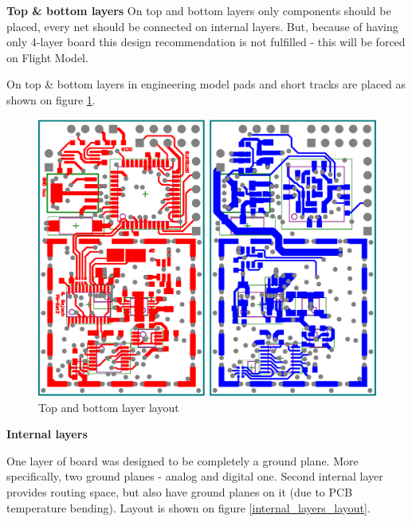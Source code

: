         \bigskip \textbf{Top \& bottom layers}
        On top and bottom layers only components should be placed, every net should be connected on internal layers. But, because of having only 4-layer board this design recommendation is not fulfilled - this will be forced on Flight Model.

        On top \& bottom layers in engineering model pads and short tracks are placed as shown on figure \ref{top_bottom_layer_layout}.

        \begin{figure}[H]
            \centering
            \includegraphics[width=0.6\paperwidth]{img/06/top_bottom_layer_layout.eps}
            \caption{Top and bottom layer layout}
            \label{top_bottom_layer_layout}
        \end{figure}

        \bigskip \textbf{Internal layers}

        One layer of board was designed to be completely a ground plane. More specifically, two ground planes - analog and digital one. Second internal layer provides routing space, but also have ground planes on it (due to PCB temperature bending). Layout is shown on figure \ref{internal_layers_layout}.

